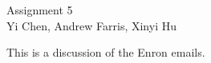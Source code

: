 \documentclass[12pt]{article}
\begin{document}
\begin{center} Assignment 5 \\ Yi Chen, Andrew Farris, Xinyi Hu \end{center}


\smallskip
This is a discussion of the Enron emails.






    
\end{document}
